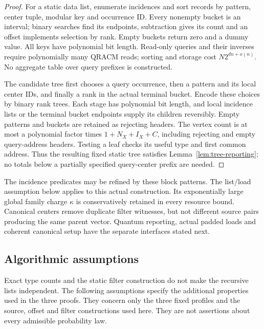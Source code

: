 \documentclass[10pt,a4paper]{article}
\theoremstyle{definition}
\begin{document}
\begin{proof}
For a static data list, enumerate incidences and sort records by pattern,
center tuple, modular key and occurrence ID. Every nonempty bucket is
an interval; binary searches find its endpoints, subtraction gives its
count and an offset implements selection by rank. Empty buckets return
zero and a dummy value. All keys have polynomial bit length. Read-only
queries and their inverses require polynomially many QRACM reads; sorting
and storage cost $N2^{dn+o(n)}$. No aggregate table over query prefixes is
constructed.

The candidate tree first chooses a query occurrence, then a pattern and
its local center IDs, and finally a rank in the actual terminal bucket.
Encode these choices by binary rank trees. Each stage has polynomial
bit length, and local incidence lists or the terminal bucket endpoints
supply its children reversibly. Empty patterns and buckets are retained
as rejecting headers. The vertex count is at most a polynomial factor times
$1+N_X+I_X+C$, including rejecting and empty query-address headers. Testing a leaf
checks its useful type and first common address. Thus the resulting
fixed static tree satisfies Lemma~\ref{lem:tree-reporting}; no totals below
a partially specified query-center prefix are needed.
\end{proof}
The incidence predicates may be refined by these block patterns.
The list/load assumption below applies to this actual construction.
Its exponentially large global family charge $\kappa$ is conservatively
retained in every resource bound. Canonical centers remove duplicate
filter witnesses, but not different source pairs producing the same
parent vector. Quantum reporting, actual padded loads and coherent
canonical setup have the separate interfaces stated next.

\subsection{Algorithmic assumptions}
\label{sec:assumptions}
Exact type counts and the static filter construction do not make the
recursive lists independent. The following assumptions specify the
additional properties used in the three proofs. They concern only the
three fixed profiles and the source, offset and filter constructions
used here. They are not assertions about every admissible probability law.
\end{document}
